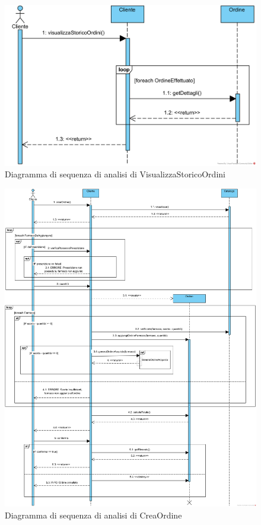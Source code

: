 \begin{figure}[h]
    \centering
	\includegraphics[width=\linewidth]{assets/sequence_analisi/SequenceAnalisiVisualizzaStoricoOrdini.png}
    \caption{Diagramma di sequenza di analisi di VisualizzaStoricoOrdini}
\end{figure}

\begin{figure}[h]
    \centering
	\includegraphics[width=\linewidth]{assets/sequence_analisi/SequenceAnalisiCreaOrdine.png}
    \caption{Diagramma di sequenza di analisi di CreaOrdine}
\end{figure}

